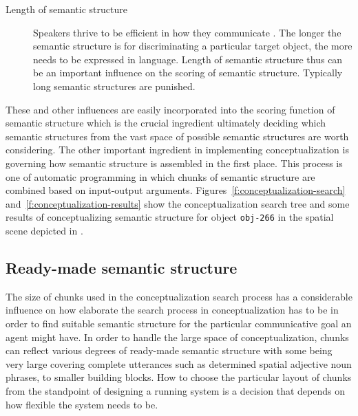 \begin{description}
\item[Length of semantic structure]
Speakers thrive to be efficient in how
they communicate \citep{dale1995computational}. The longer the 
semantic structure is for
discriminating a particular target object, the more needs to
be expressed in language. Length of semantic structure thus 
can be an important influence on the scoring of semantic structure.
Typically long semantic structures are punished.
\end{description}

These and other influences are easily incorporated 
into the scoring function of semantic structure which is the crucial
ingredient ultimately deciding which semantic structures from the vast space
of possible semantic structures are worth considering. 
The other important ingredient in implementing conceptualization 
is governing how semantic structure is assembled in the first place.
This process is one of automatic programming in which
chunks of semantic structure are combined based on 
input-output arguments. Figures~\ref{f:conceptualization-search} 
and~\ref{f:conceptualization-results} show the conceptualization 
search tree and some results of conceptualizing semantic 
structure for object {\footnotesize\tt obj-266} 
in the spatial scene depicted in .


\subsection{Ready-made semantic structure}
The size of chunks used in the conceptualization search process 
has a considerable influence on how elaborate
the search process in conceptualization has to be in order to find suitable
semantic structure for the particular communicative goal an agent might have.
In order to handle the large space of conceptualization, chunks can 
reflect various degrees of ready-made semantic structure with some 
being very large covering complete utterances such as determined spatial
adjective noun phrases, to smaller building blocks. How to choose 
the particular layout of chunks from the standpoint of designing
a running system is a decision that depends on how flexible the system
needs to be.


